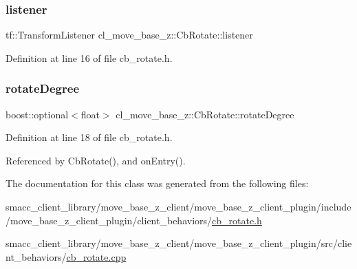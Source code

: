 \subsubsection{\texorpdfstring{listener}{listener}}
{\footnotesize\ttfamily tf\+::\+Transform\+Listener cl\+\_\+move\+\_\+base\+\_\+z\+::\+Cb\+Rotate\+::listener}



Definition at line 16 of file cb\+\_\+rotate.\+h.

\mbox{\label{classcl__move__base__z_1_1CbRotate_a83e9f97e917044f919c98a55d8e00db6}} 
\subsubsection{\texorpdfstring{rotate\+Degree}{rotateDegree}}
{\footnotesize\ttfamily boost\+::optional$<$float$>$ cl\+\_\+move\+\_\+base\+\_\+z\+::\+Cb\+Rotate\+::rotate\+Degree}



Definition at line 18 of file cb\+\_\+rotate.\+h.



Referenced by Cb\+Rotate(), and on\+Entry().



The documentation for this class was generated from the following files\+:\begin{DoxyCompactItemize}
\item 
smacc\+\_\+client\+\_\+library/move\+\_\+base\+\_\+z\+\_\+client/move\+\_\+base\+\_\+z\+\_\+client\+\_\+plugin/include/move\+\_\+base\+\_\+z\+\_\+client\+\_\+plugin/client\+\_\+behaviors/\hyperlink{cb__rotate_8h}{cb\+\_\+rotate.\+h}\item 
smacc\+\_\+client\+\_\+library/move\+\_\+base\+\_\+z\+\_\+client/move\+\_\+base\+\_\+z\+\_\+client\+\_\+plugin/src/client\+\_\+behaviors/\hyperlink{cb__rotate_8cpp}{cb\+\_\+rotate.\+cpp}\end{DoxyCompactItemize}
